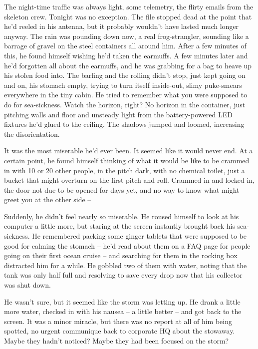 The night-time traffic was always light, some telemetry, the flirty
emails from the skeleton crew. Tonight was no exception. The file
stopped dead at the point that he'd reeled in his antenna, but it
probably wouldn't have lasted much longer anyway. The rain was
pounding down now, a real frog-strangler, sounding like a barrage
of gravel on the steel containers all around him. After a few
minutes of this, he found himself wishing he'd taken the earmuffs.
A few minutes later and he'd forgotten all about the earmuffs, and
he was grabbing for a bag to heave up his stolen food into. The
barfing and the rolling didn't stop, just kept going on and on, his
stomach empty, trying to turn itself inside-out, slimy puke-smears
everywhere in the tiny cabin. He tried to remember what you were
supposed to do for sea-sickness. Watch the horizon, right? No
horizon in the container, just pitching walls and floor and
unsteady light from the battery-powered LED fixtures he'd glued to
the ceiling. The shadows jumped and loomed, increasing the
disorientation.

It was the most miserable he'd ever been. It seemed like it would
never end. At a certain point, he found himself thinking of what it
would be like to be crammed in with 10 or 20 other people, in the
pitch dark, with no chemical toilet, just a bucket that might
overturn on the first pitch and roll. Crammed in and locked in, the
door not due to be opened for days yet, and no way to know what
might greet you at the other side --

Suddenly, he didn't feel nearly so miserable. He roused himself to
look at his computer a little more, but staring at the screen
instantly brought back his sea-sickness. He remembered packing some
ginger tablets that were supposed to be good for calming the
stomach -- he'd read about them on a FAQ page for people going on
their first ocean cruise -- and searching for them in the rocking
box distracted him for a while. He gobbled two of them with water,
noting that the tank was only half full and resolving to save every
drop now that his collector was shut down.

He wasn't sure, but it seemed like the storm was letting up. He
drank a little more water, checked in with his nausea -- a little
better -- and got back to the screen. It was a minor miracle, but
there was no report at all of him being spotted, no urgent
communique back to corporate HQ about the stowaway. Maybe they
hadn't noticed? Maybe they had been focused on the storm?

